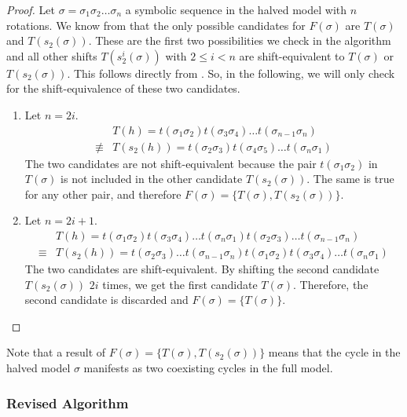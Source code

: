 \begin{proof}
	Let $\sigma = \sigma_1\sigma_2 \dots \sigma_n$ a symbolic sequence in the halved model with $n$ rotations.
	We know from  that the only possible candidates for $F(\sigma)$ are $T(\sigma)$ and $T(s_2(\sigma))$.
	These are the first two possibilities we check in the algorithm and all other shifts $T(s_2^i(\sigma))$ with $2 \leq i < n$ are shift-equivalent to $T(\sigma)$ or $T(s_2(\sigma))$.
	This follows directly from .
	So, in the following, we will only check for the shift-equivalence of these two candidates.
	\begin{enumerate}
		\item Let $n = 2i$.
		      \begin{align*}
			              & T(h) = t(\sigma_1\sigma_2) t(\sigma_3\sigma_4) \dots t(\sigma_{n-1}\sigma_n)  \\
			      \nequiv & T(s_2(h)) = t(\sigma_2\sigma_3) t(\sigma_4\sigma_5) \dots t(\sigma_n\sigma_1)
		      \end{align*}
		      The two candidates are not shift-equivalent because the pair $t(\sigma_1\sigma_2)$ in $T(\sigma)$ is not included in the other candidate $T(s_2(\sigma))$.
		      The same is true for any other pair, and therefore $F(\sigma) = \{T(\sigma), T(s_2(\sigma))\}$.
		\item Let $n = 2i + 1$.
		      \begin{align*}
			             & T(h) = t(\sigma_1\sigma_2) t(\sigma_3\sigma_4) \dots t(\sigma_n\sigma_1) t(\sigma_2\sigma_3) \dots t(\sigma_{n-1}\sigma_n)      \\
			      \equiv & T(s_2(h)) = t(\sigma_2\sigma_3) \dots t(\sigma_{n-1}\sigma_n) t(\sigma_1\sigma_2) t(\sigma_3\sigma_4) \dots t(\sigma_n\sigma_1)
		      \end{align*}
		      The two candidates are shift-equivalent.
		      By shifting the second candidate $T(s_2(\sigma))$ $2i$ times, we get the first candidate $T(\sigma)$.
		      Therefore, the second candidate is discarded and $F(\sigma) = \{T(\sigma)\}$.
	\end{enumerate}
\end{proof}

Note that a result of $F(\sigma) = \{T(\sigma), T(s_2(\sigma))\}$ means that the cycle in the halved model $\sigma$ manifests as two coexisting cycles in the full model.

\subsubsection{Revised Algorithm}


